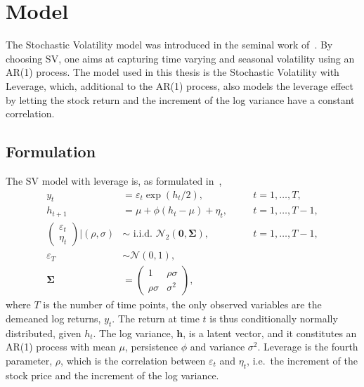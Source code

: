 \newcommand*{\yts}{y_t^\ast}
\newcommand*{\ets}{\varepsilon_t^\ast}

\section{Model}

The Stochastic Volatility model was introduced in the seminal work of~\citet{Taylor1982}.
By choosing SV, one aims at capturing time varying and seasonal volatility using an AR(1) process.
The model used in this thesis is the Stochastic Volatility with Leverage, which, additional to the AR(1) process, also models the leverage effect by letting the stock return and the increment of the log variance have a constant correlation.

\subsection{Formulation}

The SV model with leverage is, as formulated in~\citet{Omori2007},
\begin{equation}
\begin{alignedat}{2}\label{form:orig_model}
y_t & = \varepsilon_t\exp\left(h_t/2\right), && \quad t=1,\dots,T, \\
h_{t+1} & = \mu+\phi(h_t-\mu)+\eta_t, && \quad t=1,\dots,T-1, \\
\begin{pmatrix}
\varepsilon_t \\
\eta_t
\end{pmatrix}
\bigg\vert\left(\rho,\sigma\right) & \sim\text{ i.i.d. }\mathcal{N}_2\left(\bm{0},\bm{\Sigma}\right), && \quad t=1,\dots,T-1, \\
\varepsilon_T &\sim\mathcal{N}(0,1), \\
\bm{\Sigma} & =
\begin{pmatrix}
1 & \rho\sigma \\
\rho\sigma & \sigma^2
\end{pmatrix},
\end{alignedat}
\end{equation}
where $T$ is the number of time points, the only observed variables are the demeaned log returns, $y_t$.
The return at time $t$ is thus conditionally normally distributed, given $h_t$.
The log variance, $\bm{h}$, is a latent vector, and it constitutes an AR(1) process with mean $\mu$, persistence $\phi$ and variance $\sigma^2$.
Leverage is the fourth parameter, $\rho$, which is the correlation between $\varepsilon_t$ and $\eta_t$, i.e.\ the increment of the stock price and the increment of the log variance.

